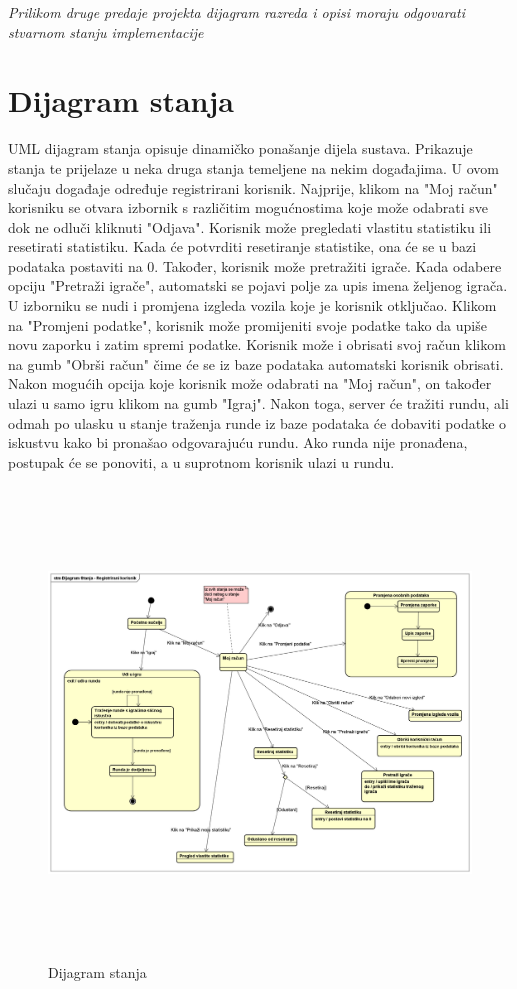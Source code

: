 			\textit{Prilikom druge predaje projekta dijagram razreda i opisi moraju odgovarati stvarnom stanju implementacije}
			
			
			
			\eject
		
		\section{Dijagram stanja}
			
			{UML dijagram stanja opisuje dinamičko ponašanje dijela sustava. Prikazuje stanja te prijelaze u neka druga stanja temeljene na nekim događajima. U ovom slučaju događaje određuje registrirani korisnik. Najprije, klikom na "Moj račun" korisniku se otvara izbornik s različitim mogućnostima koje može odabrati sve dok ne odluči kliknuti "Odjava". Korisnik može pregledati vlastitu statistiku ili resetirati statistiku. Kada će potvrditi resetiranje statistike, ona će se u bazi podataka postaviti na 0. Također, korisnik može pretražiti igrače. Kada odabere opciju "Pretraži igrače", automatski se pojavi polje za upis imena željenog igrača. U izborniku se nudi i promjena izgleda vozila koje je korisnik otključao. Klikom na "Promjeni podatke", korisnik može promijeniti svoje podatke tako da upiše novu zaporku i zatim spremi podatke. Korisnik može i obrisati svoj račun klikom na gumb "Obrši račun" čime će se iz baze podataka automatski korisnik obrisati. Nakon mogućih opcija koje korisnik može odabrati na "Moj račun", on također ulazi u samo igru klikom na gumb "Igraj". Nakon toga, server će tražiti rundu, ali odmah po ulasku u stanje traženja runde iz baze podataka će dobaviti podatke o iskustvu kako bi pronašao odgovarajuću rundu. Ako runda nije pronađena, postupak će se ponoviti, a u suprotnom korisnik ulazi u rundu.}
		
			
			\begin{figure}[h]
				\centering
				\includegraphics[width=17.5cm,height=12.5cm]{Dijagram Stanja - Registrirani korisnik}
				\caption{Dijagram stanja}
				\label{fig:stm}

			\end{figure}
			
